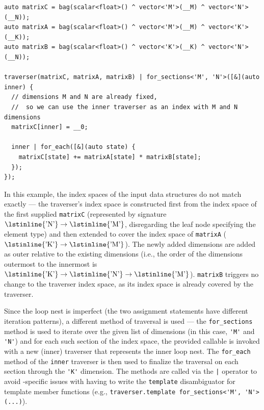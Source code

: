 \begin{lstlisting}[style=C++, caption={A layout-agnostic matrix multiplication algorithm using Noarr traversers}, label=lst:layout-agnostic-matmul-traverser,basicstyle=\ttfamily\scriptsize]
auto matrixC = bag(scalar<float>() ^ vector<'M'>(__M) ^ vector<'N'>(__N));
auto matrixA = bag(scalar<float>() ^ vector<'M'>(__M) ^ vector<'K'>(__K));
auto matrixB = bag(scalar<float>() ^ vector<'K'>(__K) ^ vector<'N'>(__N));

traverser(matrixC, matrixA, matrixB) | for_sections<'M', 'N'>([&](auto inner) {
  // dimensions M and N are already fixed,
  //  so we can use the inner traverser as an index with M and N dimensions
  matrixC[inner] = __0;

  inner | for_each([&](auto state) {
    matrixC[state] += matrixA[state] * matrixB[state];
  });
});
\end{lstlisting}

In this example, the index spaces of the input data structures do not match exactly --- the traverser's index space is constructed first from the index space of the first supplied \lstinline{matrixC} (represented by signature $\text{\lstinline{'N'}} \to \text{\lstinline{'M'}}$, disregarding the leaf node specifying the element type) and then extended to cover the index space of \lstinline{matrixA} ($\text{\lstinline{'K'}} \to \text{\lstinline{'M'}}$). The newly added dimensions are added as outer relative to the existing dimensions (i.e., the order of the dimensions outermost to the innermost is $\text{\lstinline{'K'}} \to \text{\lstinline{'N'}} \to \text{\lstinline{'M'}}$). \lstinline{matrixB} triggers no change to the traverser index space, as its index space is already covered by the traverser.

Since the loop nest is imperfect (the two assignment statements have different iteration patterns), a different method of traversal is used --- the \lstinline{for_sections} method is used to iterate over the given list of dimensions (in this case, \lstinline{'M'} and \lstinline{'N'}) and for each such section of the index space, the provided callable is invoked with a new (inner) traverser that represents the inner loop nest. The \lstinline{for_each} method of the \lstinline{inner} traverser is then used to finalize the traversal on each section through the \lstinline{'K'} dimension. The methods are called via the \lstinline{|} operator to avoid \cpp-specific issues with having to write the \lstinline{template} disambiguator for template member functions (e.g., \lstinline{traverser.template for_sections<'M', 'N'>(...)}).



